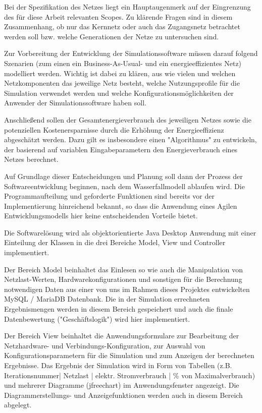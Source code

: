 \documentclass[12pt,titlepage]{article}
\begin{document}
Bei der Spezifikation des Netzes liegt ein Hauptaugenmerk auf der Eingrenzung des für diese Arbeit relevanten Scopes. Zu klärende Fragen sind in diesem Zusammenhang, ob nur das Kernnetz oder auch das Zugangsnetz betrachtet werden soll bzw. welche Generationen der Netze zu untersuchen sind. 
 
Zur Vorbereitung der Entwicklung der Simulationssoftware müssen darauf folgend Szenarien (zum einen ein Business-As-Usual- und ein energieeffizientes Netz) modelliert werden. Wichtig ist dabei zu klären, aus wie vielen und welchen Netzkomponenten das jeweilige Netz besteht, welche Nutzungsprofile für die Simulation verwendet werden und welche Konfigurationsmöglichkeiten der Anwender der Simulationssoftware haben soll. 
 
Anschließend sollen der Gesamtenergieverbrauch des jeweiligen Netzes sowie die potenziellen Kostenersparnisse durch die Erhöhung der Energieeffizienz abgeschätzt werden. Dazu gilt es insbesondere einen "Algorithmus" zu entwickeln, der basierend auf variablen Eingabeparametern den Energieverbrauch eines Netzes berechnet. 
 
Auf Grundlage dieser Entscheidungen und Planung soll dann der Prozess der Softwareentwicklung beginnen, nach dem Wasserfallmodell ablaufen wird. Die Programmaufteilung und geforderte Funktionen sind bereits vor der Implementierung hinreichend bekannt, so dass die Anwendung eines Agilen Entwicklungsmodells hier keine entscheidenden Vorteile bietet.
 
Die Softwarelösung wird als objektorientierte Java Desktop Anwendung mit einer Einteilung der Klassen in die drei Bereiche Model, View und Controller implementiert.
 
Der Bereich Model beinhaltet das Einlesen so wie auch die Manipulation von Netzlast-Werten, Hardwarekonfigurationen und sonstigen für die Berechnung notwendigen Daten aus einer von uns im Rahmen dieses Projektes entwickelten MySQL / MariaDB Datenbank. Die in der Simulation errechneten Ergebnismengen werden in diesem Bereich gespeichert und auch die finale Datenbewertung ("Geschäftslogik") wird hier implementiert.
 
Der Bereich View beinhaltet die Anwendungsformulare zur Bearbeitung der Netz\-hard\-ware- und Verbindungs-Kon\-figura\-tion, zur Auswahl von Konfigurationsparametern für die Simulation und zum Anzeigen der berechneten Ergebnisse. Das Ergebnis der Simulation wird in Form von Tabellen (z.B. Iterationsnummer| Netzlast | elektr. Stromverbrauch | \% von Maximalverbrauch) und mehrerer Diagramme (jfreechart) im Anwendungsfenster angezeigt. Die Diagrammerstellungs- und Anzeigefunktionen werden auch in diesem Bereich abgelegt.
 
\end{document}
